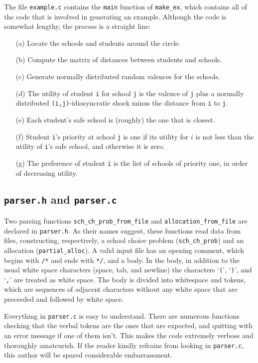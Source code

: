 \documentclass[12pt]{article}
\theoremstyle{definition}
\begin{document}
\begin{appendix}
The file \texttt{example.c} contains the \texttt{main} function of
\texttt{make\_ex}, which contains all of the code that is involved in
generating an example.  Although the code is somewhat lengthy, the
process is a straight line:
\begin{enumerate}
  \item[(a)] Locate the schools and students around the circle.
  \item[(b)] Compute the matrix of distances between students and schools.
  \item[(c)] Generate normally distributed random valences for the schools.
  \item[(d)] The utility of student \texttt{i} for school \texttt{j}
    is the valence of \texttt{j} plus a normally distributed
    \texttt{(i,j)}-idiosyncratic shock minus the distance from
    \texttt{i} to \texttt{j}.
  \item[(e)] Each student's safe school is (roughly) the one that is closest.
  \item[(f)] Student \texttt{i}'s priority at school \texttt{j} is one
    if its utility for $i$ is not less than the utility of
    \texttt{i}'s safe school, and otherwise it is zero.
  \item[(g)] The preference of student \texttt{i} is the list of
    schools of priority one, in order of decreasing utility.
\end{enumerate}

\subsection{\texttt{parser.h} and \texttt{parser.c}}

Two parsing functions \texttt{sch\_ch\_prob\_from\_file} and
\texttt{allocation\_from\_file} are declared in \texttt{parser.h}.  As
their names suggest, these functions read data from files,
constructing, respectively, a school choice problem
(\texttt{sch\_ch\_prob}) and an allocation (\texttt{partial\_alloc}).
A valid input file has an opening comment, which begins with
\texttt{/*} and ends with \texttt{*/}, and a body.  In the body, in
addition to the usual white space characters (space, tab, and newline)
the characters `\texttt{(}', `\texttt{)}', and `\texttt{,}' are
treated as white space.  The body is divided into whitespace and
tokens, which are sequences of adjacent characters without any white
space that are preceeded and followed by white space.

Everything in \texttt{parser.c} is easy to understand.  There are
numerous functions checking that the verbal tokens are the ones that
are expected, and quitting with an error message if one of them
isn't. This makes the code extremely verbose and thoroughly
amateurish.  If the reader kindly refrains from looking in
\texttt{parser.c}, this author will be spared considerable
embarrassment.


\end{appendix}
\end{document}
